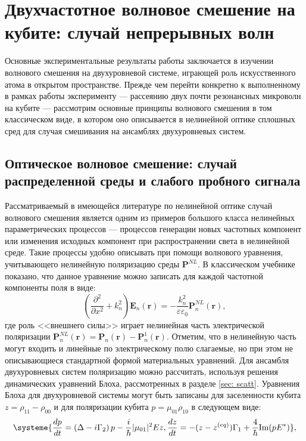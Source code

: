 \chapter{Двухчастотное волновое смешение на кубите: случай непрерывных волн}
\label{ch: cwm}
Основные экспериментальные результаты работы заключается в изучении волнового смешения на двухуровневой системе, играющей роль искусственного атома в открытом пространстве. Прежде чем перейти конкретно к выполненному в рамках работы эксперименту --- рассеянию двух почти резонансных микроволн на кубите --- рассмотрим основные принципы волнового смешения в том классическом виде, в котором оно описывается в нелинейной оптике сплошных сред для случая смешивания на ансамблях двухуровневых систем.
\section{Оптическое волновое смешение: случай распределенной среды и слабого пробного сигнала}
Рассматриваемый в имеющейся литературе по нелинейной оптике случай волнового смешения является одним из примеров большого класса нелинейных параметрических процессов --- процессов генерации новых частотных компонент или изменения исходных компонент при распространении света в нелинейной среде. Такие процессы удобно описывать при помощи волнового уравнения, учитывающего нелинейную поляризацию среды $\mathbf{P}^{N\!L}$. В классическом учебнике \cite{boyd2003nonlinear} показано, что данное уравнение можно записать для каждой частотной компоненты поля в виде:
\begin{equation}
\left( \frac{\partial^2}{\partial x^2} + k_n^2\right) \mathbf{E}_n(\mathbf{r}) = -\frac{k_n^2}{\varepsilon\varepsilon_0}\mathbf{P}^{N\!L}_n(\mathbf{r}),
\label{eq: P_NL}
\end{equation}
где роль <<внешнего силы>> играет нелинейная часть электрической поляризации $\mathbf{P}^{N\!L}_n(\mathbf{r}) = \mathbf{P}_n(\mathbf{r}) - \mathbf{P}^{1}_n(\mathbf{r})$. Отметим, что в нелинейную часть могут входить и линейные по электрическому полю слагаемые, но при этом не описывающиеся стандартной формой материальных уравнений. Для ансамбля двухуровневых систем поляризацию можно рассчитать, используя решения динамических уравнений Блоха, рассмотренных в разделе \ref{sec: scatt}. Уравнения Блоха для двухуровневой системы могут быть записаны для заселенности кубита $z = \rho_{11}-\rho_{00}$ и для поляризации кубита $p=\mu_{01}\rho_{10}$ в следующем виде:
\begin{equation}
\systeme{\frac{dp}{dt} = \left(\Delta-i\Gamma_2\right)p -\frac{i}{\hbar}|\mu_{01}|^2Ez,
	\frac{dz}{dt} = -(z-z^{(eq)})\Gamma_1 + \frac{4}{\hbar}\text{Im}(pE^*)},
\label{eq: bloch_p_z}
\end{equation}
